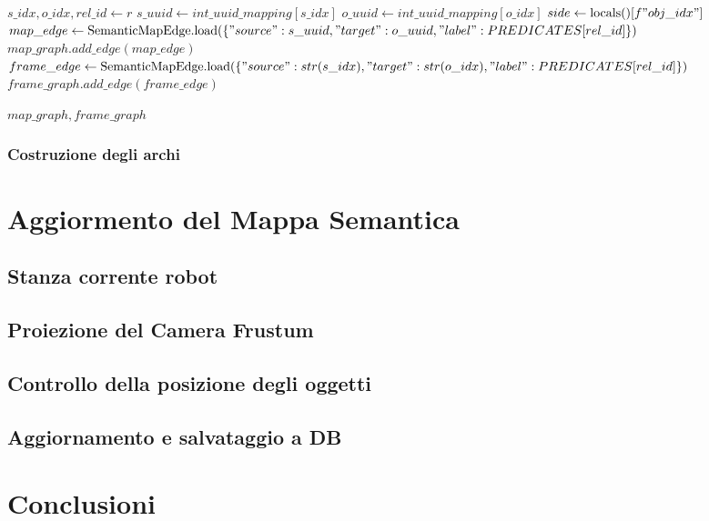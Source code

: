 \begin{algorithm}[H]
\begin{algorithmic}[1]
      \State $s\_idx, o\_idx, rel\_id \gets r$
      \State $s\_uuid \gets int\_uuid\_mapping[s\_idx]$
      \State $o\_uuid \gets int\_uuid\_mapping[o\_idx]$
              \State $side \gets \text{locals()}[f"{obj}\_idx"]$
              \State $map\_edge \gets \text{SemanticMapEdge.load}(\{ "source": s\_uuid, "target": o\_uuid, "label": PREDICATES[rel\_id] \})$
              \State $map\_graph.add\_edge(map\_edge)$
                  \State $frame\_edge \gets \text{SemanticMapEdge.load}(\{ "source": str(s\_idx), "target": str(o\_idx), "label": PREDICATES[rel\_id] \})$
                  \State $frame\_graph.add\_edge(frame\_edge)$
              \EndIf
          \EndFor
      \EndIf
  \EndFor
  
  \Return $map\_graph, frame\_graph$
  \EndProcedure
  \end{algorithmic}
  \end{algorithm}

\subsubsection{Costruzione degli archi}

\section{Aggiormento del Mappa Semantica}
\subsection{Stanza corrente robot}
\subsection{Proiezione del Camera Frustum}
\subsection{Controllo della posizione degli oggetti}
\subsection{Aggiornamento e salvataggio a DB}



\section{Conclusioni}

